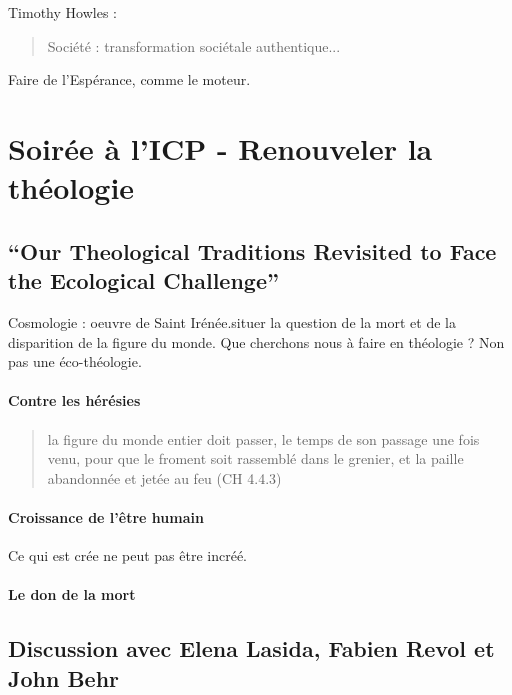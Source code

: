 Timothy Howles : 
\begin{quote}
    Société : transformation sociétale authentique... 
\end{quote}

Faire de l'Espérance, comme le moteur.






\section{Soirée à l’ICP - Renouveler la théologie}

 
\subsection{“Our Theological Traditions Revisited to Face the Ecological Challenge”}

Cosmologie : oeuvre de Saint Irénée.situer la question de la mort et de la disparition de la figure du monde. Que cherchons nous à faire en théologie ? Non pas une éco-théologie. 


\paragraph{Contre les hérésies} 
\begin{quote}
  la figure du monde entier doit passer, le temps de son passage une fois venu, pour que le froment soit rassemblé dans le grenier, et la paille abandonnée et jetée au feu (CH 4.4.3)  
\end{quote}

\paragraph{Croissance de l'être humain}

Ce qui est crée ne peut pas être incréé. 

\paragraph{Le don de la mort}

\subsection{Discussion avec Elena Lasida, Fabien Revol et John Behr}

